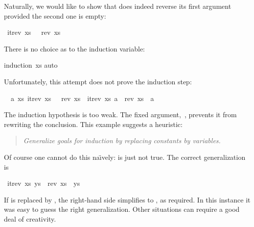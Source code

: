 \begin{isabellebody}
\begin{isamarkuptext}
Naturally, we would like to show that  does indeed reverse
its first argument provided the second one is empty:%
\end{isamarkuptext}%
\isamarkuptrue%
\isamarkupfalse%
\ {}itrev\ xs\ {}{}\ {}\ rev\ xs{}%
\isadelimproof
%
\endisadelimproof
%
\isatagproof
%
\begin{isamarkuptxt}%
There is no choice as to the induction variable:%
\end{isamarkuptxt}%
\isamarkuptrue%
\isamarkupfalse%
{}induction\ xs{}\isanewline
{}\isamarkupfalse%
{}auto{}%
\begin{isamarkuptxt}%
Unfortunately, this attempt does not prove
the induction step:
\begin{isabelle}%
\ {}{}\ {}a\ xs{}\ itrev\ xs\ {}{}\ {}\ rev\ xs\ {}\ itrev\ xs\ {}a{}\ {}\ rev\ xs\ {}\ {}a{}%
\end{isabelle}
The induction hypothesis is too weak.  The fixed
argument,~, prevents it from rewriting the conclusion.  
This example suggests a heuristic:
\begin{quote}
\emph{Generalize goals for induction by replacing constants by variables.}
\end{quote}
Of course one cannot do this na\"{\i}vely:  is
just not true.  The correct generalization is%
\end{isamarkuptxt}%
\isamarkuptrue%
%
\endisatagproof
{\isafoldproof}%
%
\isadelimproof
%
\endisadelimproof
{}\isamarkupfalse%
\ {}itrev\ xs\ ys\ {}\ rev\ xs\ {}\ ys{}%
\isadelimproof
%
\endisadelimproof
%
\isatagproof
%
\begin{isamarkuptxt}%
If  is replaced by , the right-hand side simplifies to
, as required.
In this instance it was easy to guess the right generalization.
Other situations can require a good deal of creativity.  


\end{isamarkuptxt}
\end{isabellebody}
